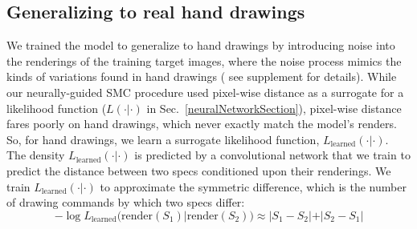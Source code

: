 \documentclass{article}
\theoremstyle{definition}
\begin{document}
\subsection{Generalizing to real hand drawings}\label{generalizingTheHandDrawings}

 We trained the model
to generalize to hand drawings by introducing noise into the
renderings of the training target images, where the noise process  mimics the kinds of variations found in hand drawings (%
see supplement for details).
While our neurally-guided SMC procedure
used pixel-wise distance as a surrogate for a likelihood function ($L(\cdot|\cdot)$ in Sec.~\ref{neuralNetworkSection}),
 pixel-wise distance fares poorly on hand drawings, which never exactly match
the model's renders.
So, for hand drawings,
we learn a surrogate likelihood function,
$L_{\text{learned}}(\cdot|\cdot)$.
The density $L_{\text{learned}}(\cdot|\cdot)$ is predicted by a convolutional network that we train to predict
the distance between two specs conditioned upon their renderings.
We train $L_{\text{learned}}(\cdot |\cdot )$  to approximate the symmetric difference,
which is  the number of drawing commands by which two specs  differ:
  \begin{equation}
    -\log L_{\text{learned}}(\text{render}(S_1)|\text{render}(S_2))\approx |S_1 - S_2| + |S_2 - S_1|\label{symmetricDistance}
    \end{equation}
\end{document}
